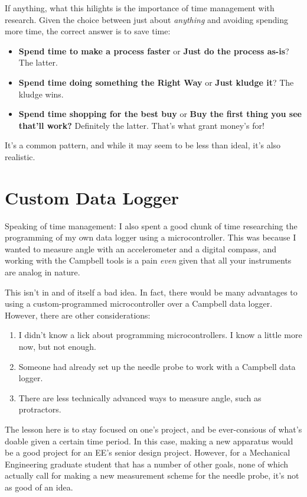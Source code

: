 If anything, what this hilights is the importance of time management
with research. Given the choice between just about \emph{anything} and
avoiding spending more time, the correct answer is to save time:

\begin{itemize}
\item
  \textbf{Spend time to make a process faster} or \textbf{Just do the
  process as-is}? The latter.
\item
  \textbf{Spend time doing something the Right Way} or \textbf{Just
  kludge it}? The kludge wins.
\item
  \textbf{Spend time shopping for the best buy} or \textbf{Buy the first
  thing you see that'll work?} Definitely the latter. That's what grant
  money's for!
\end{itemize}
It's a common pattern, and while it may seem to be less than ideal, it's
also realistic.

\section{Custom Data Logger}

Speaking of time management: I also spent a good chunk of time
researching the programming of my own data logger using a
microcontroller. This was because I wanted to measure angle with an
accelerometer and a digital compass, and working with the Campbell tools
is a pain \emph{even} given that all your instruments are analog in
nature.

This isn't in and of itself a bad idea. In fact, there would be many
advantages to using a custom-programmed microcontroller over a Campbell
data logger. However, there are other considerations:

\begin{enumerate}[1.]
\item
  I didn't know a lick about programming microcontrollers. I know a
  little more now, but not enough.
\item
  Someone had already set up the needle probe to work with a Campbell
  data logger.
\item
  There are less technically advanced ways to measure angle, such as
  protractors.
\end{enumerate}
The lesson here is to stay focused on one's project, and be
ever-consious of what's doable given a certain time period. In this
case, making a new apparatus would be a good project for an EE's senior
design project. However, for a Mechanical Engineering graduate student
that has a number of other goals, none of which actually call for making
a new measurement scheme for the needle probe, it's not as good of an
idea.

